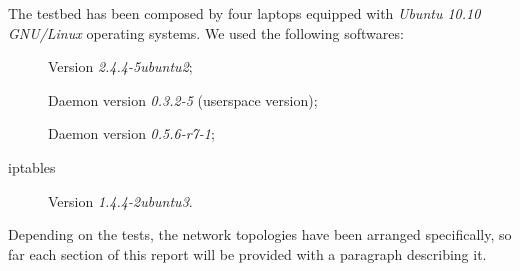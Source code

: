     The testbed has been composed by four laptops equipped with
    \emph{Ubuntu 10.10 GNU/Linux} operating systems. We used the following
    softwares:
    \begin{description}
    \item[\netperf] Version \emph{2.4.4-5ubuntu2};
    \item[\batman] Daemon version \emph{0.3.2-5} (userspace version);
    \item[\olsr] Daemon version \emph{0.5.6-r7-1};
    \item[iptables] Version \emph{1.4.4-2ubuntu3}.
    \end{description}

    Depending on the tests, the network topologies have been arranged
    specifically, so far each section of this report will be provided with
    a paragraph describing it.

